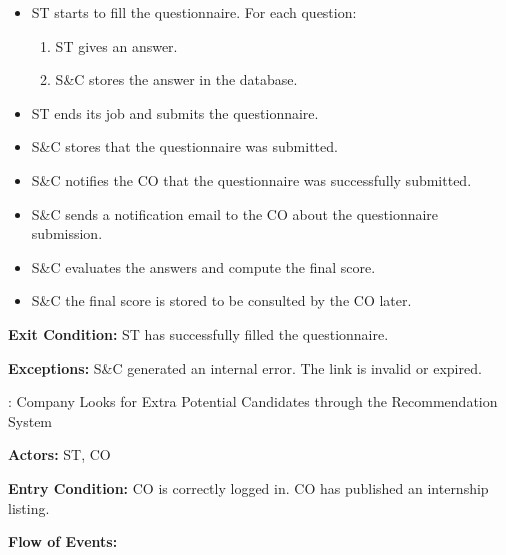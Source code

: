 \begin{itemize}
    \item ST starts to fill the questionnaire. For each question:
    \begin{enumerate}
        \item ST gives an answer.
        \item S\&C stores the answer in the database.
    \end{enumerate}
    \item ST ends its job and submits the questionnaire.
    \item S\&C stores that the questionnaire was submitted.
    \item S\&C notifies the CO that the questionnaire was successfully submitted.
    \item S\&C sends a notification email to the CO about the questionnaire submission.
    \item S\&C evaluates the answers and compute the final score.
    \item S\&C the final score is stored to be consulted by the CO later.
\end{itemize}

\par \textbf{Exit Condition:} ST has successfully filled the questionnaire.

\par \textbf{Exceptions:}  S\&C generated an internal error. The link is invalid or expired.

\nextUseCaseID: Company Looks for Extra Potential Candidates through the Recommendation System

\par \textbf{Actors:} ST, CO

\par \textbf{Entry Condition:} CO is correctly logged in. CO has published an internship listing.

\par \textbf{Flow of Events:}

